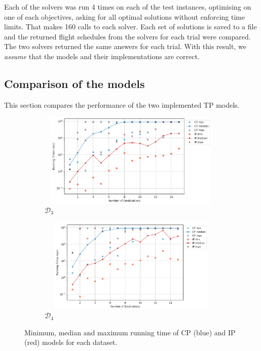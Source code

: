 \documentclass{mpaper}
\begin{document}
Each of the solvers was run 4 times on each of the test instances, optimising on one of each objectives, asking for all optimal solutions without enforcing time limits. That makes 160 calls to each solver. Each set of solutions is saved to a file and the returned flight schedules from the solvers for each trial were compared. The two solvers returned the same answers for each trial. With this result, we \textit{assume} that the models and their implementations are correct.

\subsection{Comparison of the models}
\label{experiments:cpvsip}
This section compares the performance of the two implemented TP models.

\begin{figure}[!ht]
    \centering
    \begin{subfigure}[b]{0.49\textwidth}
        \includegraphics[width=9cm, height = 4.5cm]{cpipexperiments/d_cpip_log.png}
        \caption{$\mathcal{D}_3$}
        \label{fig:cpip_d}
    \end{subfigure}
    \begin{subfigure}[b]{0.49\textwidth}
        \includegraphics[width=9cm, height = 4.5cm]{cpipexperiments/d2_cpip_log.png}
        \caption{$\mathcal{D}_4$}
        \label{fig:cpip_d2}
    \end{subfigure}
    \caption{Minimum, median and maximum running time of CP (blue) and IP (red) models for each dataset.}
    \label{cpip}
\end{figure}
\end{document}

